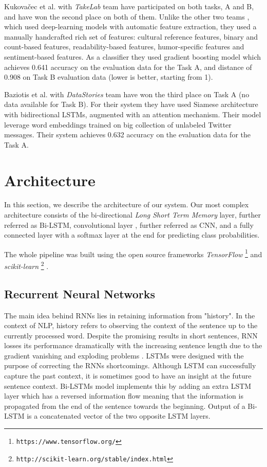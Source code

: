 \documentclass[10pt, a4paper]{article}
\begin{document}
Kukova\v{c}ec et al. with \emph{TakeLab} team have participated on both tasks, A and B, and have won the second place on both of them. Unlike the other two teams \citep{humorhawk2017,datastories2017}, which used deep-learning models with automatic feature extraction, they used a manually handcrafted rich set of features:  cultural reference features, binary and count-based features, readability-based features, humor-specific features and sentiment-based features. As a classifier they used gradient boosting model which achieves 0.641 accuracy on the evaluation data for the Task A, and distance of 0.908 on Task B evaluation data (lower is better, starting from 1).

Baziotis et al. with \emph{DataStories} team have won the third place on Task A (no data available for Task B). For their system they have used Siamese architecture \citep{siamese1993} with bidirectional LSTMs, augmented with an attention mechanism. Their model leverage word embeddings trained on big collection of unlabeled Twitter messages. Their system achieves 0.632 accuracy on the evaluation data for the Task A.

\section{Architecture}

In this section, we describe the architecture of our system. Our most complex
architecture consists of the bi-directional
\emph{Long Short Term Memory} \citep{lstm1997} layer, further referred as Bi-LSTM,
convolutional layer \citep{cnn1998}, further referred as CNN, and a fully connected
layer with a softmax layer at the end for predicting class probabilities.

The whole pipeline was built using the open source frameworks
\emph{TensorFlow} \footnote{\texttt{https://www.tensorflow.org/}} \citep{tensorflow2015}
and
\emph{scikit-learn} \footnote{\texttt{http://scikit-learn.org/stable/index.html}} \citep{scikit-learn}.

\subsection{Recurrent Neural Networks}

The main idea behind RNNs lies in retaining information from "history". In the 
context of NLP, history refers to observing the context of the sentence up to the
currently processed word. Despite the promising results in short sentences, RNN
losses its performance dramatically with the increasing sentence length due to 
the gradient vanishing \citep{bengio1994learning} and exploding problems 
\citep{pascanu2013difficulty}. LSTMs were designed with the purpose of correcting 
the RNNs shortcomings. Although LSTM can successfully capture the past context,
it is sometimes good to have an insight at the future sentence context. Bi-LSTMs 
model implements this by adding an extra LSTM layer which has a reversed information flow
meaning that the information is propagated from the end of the sentence towards
the beginning. Output of a Bi-LSTM is a concatenated vector of the two opposite LSTM layers.
\end{document}
